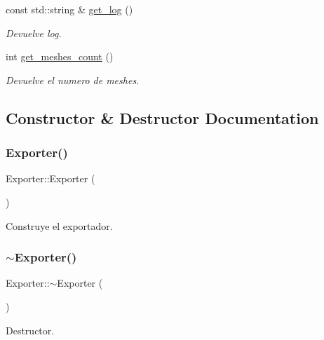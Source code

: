 \begin{DoxyCompactItemize}
const std\+::string \& \mbox{\hyperlink{class_exporter_a46b7cd63af64656de8a9ab0b36b52d6f}{get\+\_\+log}} ()
\begin{DoxyCompactList}\small\item\em Devuelve log. \end{DoxyCompactList}\item 
int \mbox{\hyperlink{class_exporter_a3e6552a8e20d64bc630cebd74c1f58f7}{get\+\_\+meshes\+\_\+count}} ()
\begin{DoxyCompactList}\small\item\em Devuelve el numero de meshes. \end{DoxyCompactList}\end{DoxyCompactItemize}


\subsection{Constructor \& Destructor Documentation}
\mbox{\label{class_exporter_a2a977cb5ac8f637fcb570e73f650eca0}} 
\subsubsection{\texorpdfstring{Exporter()}{Exporter()}}
{\footnotesize\ttfamily Exporter\+::\+Exporter (\begin{DoxyParamCaption}{ }\end{DoxyParamCaption})}



Construye el exportador. 

\mbox{\label{class_exporter_a0d1b2893c5cef1e4d4d52fcb1e0759ea}} 
\subsubsection{\texorpdfstring{$\sim$Exporter()}{~Exporter()}}
{\footnotesize\ttfamily Exporter\+::$\sim$\+Exporter (\begin{DoxyParamCaption}{ }\end{DoxyParamCaption})\hspace{0.3cm}{\ttfamily [default]}}



Destructor. 



